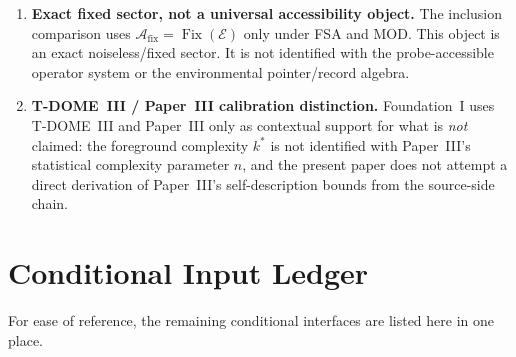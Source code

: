 \documentclass[12pt]{article}
\theoremstyle{definition}
\theoremstyle{remark}
\begin{document}
\begin{enumerate}
\item \textbf{Exact fixed sector, not a universal accessibility object.}
The inclusion comparison uses
\(\mathcal A_{\mathrm{fix}}=\operatorname{Fix}(\mathcal E)\) only under
FSA and MOD. This object is an exact noiseless/fixed sector. It is not
identified with the probe-accessible operator system or the
environmental pointer/record algebra.

\item \textbf{T-DOME~III / Paper~III calibration distinction.}
Foundation~I uses T-DOME~III and Paper~III only as contextual support
for what is \emph{not} claimed: the foreground complexity \(k^*\) is not
identified with Paper~III's statistical complexity parameter \(n\), and
the present paper does not attempt a direct derivation of Paper~III's
self-description bounds from the source-side chain.
\end{enumerate}

\section{Conditional Input Ledger}\label{app:conditional_ledger}

For ease of reference, the remaining conditional interfaces are listed
here in one place.
\end{document}
